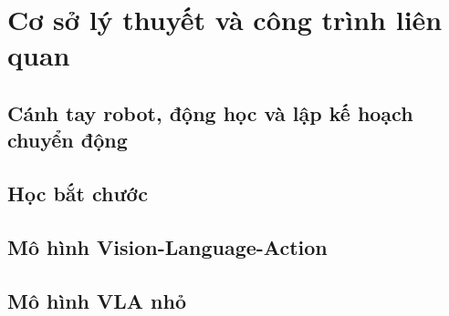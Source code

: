 \section{Cơ sở lý thuyết và công trình liên quan}
\label{sec:background}


\subsection{Cánh tay robot, động học và lập kế hoạch chuyển động}

\subsection{Học bắt chước}

\subsection{Mô hình Vision-Language-Action}

\subsection{Mô hình VLA nhỏ}

